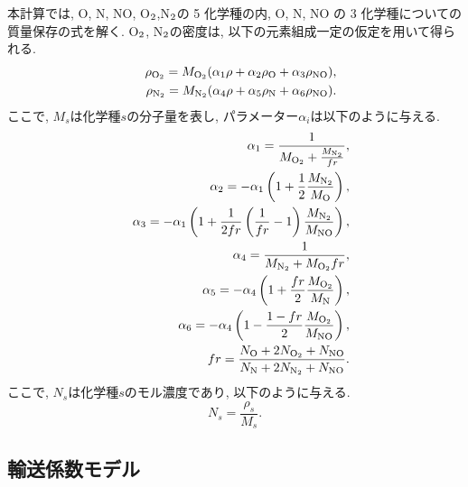 本計算では,
O, N, NO, O$_{\rm2}$,N$_{\rm2}$の 5 化学種の内,
O, N, NO の 3 化学種についての質量保存の式を解く.
O$_{\rm2}$, N$_{\rm2}$の密度は,
以下の元素組成一定の仮定を用いて得られる.
\begin{eqnarray}
&&\rho_{{\rm O}_2} = M_{{\rm O}_2} (\alpha_1 \rho + \alpha_2 \rho_{\rm O} + \alpha_3 \rho_{\rm NO} ), \\
&&\rho_{{\rm N}_2} = M_{{\rm N}_2} (\alpha_4 \rho + \alpha_5 \rho_{\rm N} + \alpha_6 \rho_{\rm NO} ).
\end{eqnarray}
ここで,
$M_{s}$は化学種$s$の分子量を表し,
パラメーター$\alpha{_i}$は以下のように与える.
\begin{eqnarray}
&&\alpha_{1}=\frac{1}{M_{{\rm O}_2}+\frac{M_{{\rm N}_2}}{fr}},\\
&&\alpha_{2}=-\alpha_1 \left( 1+\frac{1}{2} \frac{M_{{\rm N}_2}}{M_{\rm O}} \right),\\
&&\alpha_{3}=-\alpha_1 \left( 1+\frac{1}{2fr} \left( \frac{1}{fr} -1 \right) \frac{M_{{\rm N}_2}}{M_{\rm NO}} \right),\\
&&\alpha_{4}=\frac{1}{M_{{\rm N}_2}+M_{{\rm O}_2}fr},\\
&&\alpha_{5}=-\alpha_4 \left( 1+\frac{fr}{2} \frac{M_{{\rm O}_2}}{M_{\rm N}} \right),\\
&&\alpha_{6}=-\alpha_4 \left( 1-\frac{1-fr}{2} \frac{M_{{\rm O}_2}}{M_{\rm NO}} \right),\\
&&fr=\frac{N_{\rm O}+2N_{{\rm O}_2}+N_{\rm NO}} {N_{\rm N}+2N_{{\rm N}_2}+N_{\rm NO}}.
\end{eqnarray}
ここで,
$N_{s}$は化学種$s$のモル濃度であり,
以下のように与える.
\begin{equation}
N_s=\frac{\rho_s}{M_s}.
\end{equation}

\subsection{輸送係数モデル}

